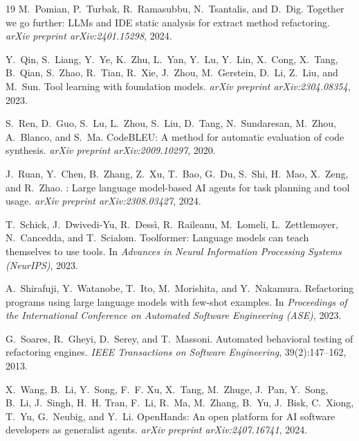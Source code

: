 \documentclass[11pt,letterpaper]{article}
\begin{document}
\begin{thebibliography}{19}
M.~Pomian, P.~Turbak, R.~Ramasubbu, N.~Tsantalis, and D.~Dig.
\newblock Together we go further: {LLMs} and {IDE} static analysis for extract method refactoring.
\newblock \emph{arXiv preprint arXiv:2401.15298}, 2024.

Y.~Qin, S.~Liang, Y.~Ye, K.~Zhu, L.~Yan, Y.~Lu, Y.~Lin, X.~Cong, X.~Tang, B.~Qian, S.~Zhao, R.~Tian, R.~Xie, J.~Zhou, M.~Gerstein, D.~Li, Z.~Liu, and M.~Sun.
\newblock Tool learning with foundation models.
\newblock \emph{arXiv preprint arXiv:2304.08354}, 2023.

S.~Ren, D.~Guo, S.~Lu, L.~Zhou, S.~Liu, D.~Tang, N.~Sundaresan, M.~Zhou, A.~Blanco, and S.~Ma.
\newblock Code{BLEU}: A method for automatic evaluation of code synthesis.
\newblock \emph{arXiv preprint arXiv:2009.10297}, 2020.

J.~Ruan, Y.~Chen, B.~Zhang, Z.~Xu, T.~Bao, G.~Du, S.~Shi, H.~Mao, X.~Zeng, and R.~Zhao.
: Large language model-based {AI} agents for task planning and tool usage.
\newblock \emph{arXiv preprint arXiv:2308.03427}, 2024.

T.~Schick, J.~Dwivedi-Yu, R.~Dess\`{i}, R.~Raileanu, M.~Lomeli, L.~Zettlemoyer, N.~Cancedda, and T.~Scialom.
\newblock Toolformer: Language models can teach themselves to use tools.
\newblock In \emph{Advances in Neural Information Processing Systems (NeurIPS)}, 2023.

A.~Shirafuji, Y.~Watanobe, T.~Ito, M.~Morishita, and Y.~Nakamura.
\newblock Refactoring programs using large language models with few-shot examples.
\newblock In \emph{Proceedings of the International Conference on Automated Software Engineering (ASE)}, 2023.

G.~Soares, R.~Gheyi, D.~Serey, and T.~Massoni.
\newblock Automated behavioral testing of refactoring engines.
\newblock \emph{IEEE Transactions on Software Engineering}, 39(2):147--162, 2013.

X.~Wang, B.~Li, Y.~Song, F.~F. Xu, X.~Tang, M.~Zhuge, J.~Pan, Y.~Song, B.~Li, J.~Singh, H.~H. Tran, F.~Li, R.~Ma, M.~Zhang, B.~Yu, J.~Bisk, C.~Xiong, T.~Yu, G.~Neubig, and Y.~Li.
\newblock Open{H}ands: An open platform for {AI} software developers as generalist agents.
\newblock \emph{arXiv preprint arXiv:2407.16741}, 2024.


\end{thebibliography}
\end{document}

